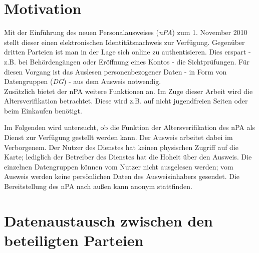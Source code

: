 \documentclass[toc=flat,fontsize=11pt,a4paper,titlepage,headsepline,numbers=noenddot, bibliography=totoc]{scrartcl}
\begin{document}
\newpage
\thispagestyle{empty}
\tableofcontents

\newpage

\section{Motivation}
Mit der Einführung des neuen Personalausweises (\textit{nPA}) zum 1. November 2010 stellt dieser einen elektronischen Identitätsnachweis zur Verfügung.
Gegenüber dritten Parteien ist man in der Lage sich online zu authentisieren. Dies erspart - z.B. bei Behördengängen oder Eröffnung eines Kontos - die Sichtprüfungen.
Für diesen Vorgang ist das Auslesen personenbezogener Daten - in Form von Datengruppen (\textit{DG}) - aus dem Ausweis notwendig.\\ 
Zusätzlich bietet der nPA weitere Funktionen an. Im Zuge dieser Arbeit wird die Altersverifikation betrachtet. Diese wird z.B. auf nicht jugendfreien Seiten oder beim 
Einkaufen benötigt. 

Im Folgenden wird untersucht, ob die Funktion der Altersverifikation des nPA als Dienst zur Verfügung gestellt werden kann. Der Ausweis arbeitet dabei im Verborgenem. 
Der Nutzer des Dienstes hat keinen physischen Zugriff auf die Karte; lediglich der Betreiber des Dienstes hat die Hoheit über den Ausweis. Die einzelnen Datengruppen 
können vom Nutzer nicht ausgelesen werden; vom Ausweis werden keine persönlichen Daten des Ausweisinhabers gesendet. Die Bereitstellung des nPA nach außen 
kann anonym stattfinden.

\section{Datenaustausch zwischen den beteiligten Parteien}
\end{document}
